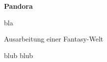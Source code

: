 \documentclass[ngerman]{letter}
\begin{document}
\begin{center}

\bfseries
Pandora
\end{center}

bla
\begin{center}

\mdseries
\fontsize{14}{14}\selectfont
Ausarbeitung einer Fantasy-Welt\\

\end{center}

blub blub
\end{document}
